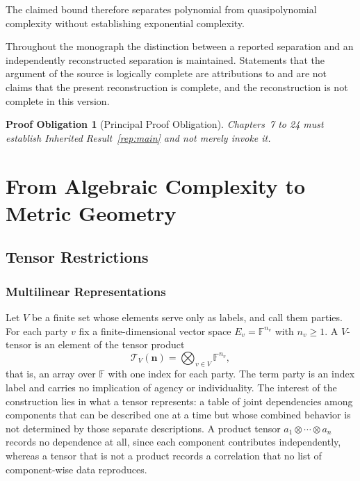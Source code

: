 \documentclass[11pt,letterpaper]{report}
\theoremstyle{plain}
\newtheorem{obligation}[theorem]{Proof Obligation}
\theoremstyle{definition}
\theoremstyle{remark}
\begin{document}
The claimed bound therefore separates polynomial from quasipolynomial complexity without establishing exponential complexity.

Throughout the monograph the distinction between a reported separation and an independently reconstructed separation is maintained. Statements that the argument of the source is logically complete are attributions to \cite{Source2026} and are not claims that the present reconstruction is complete, and the reconstruction is not complete in this version.

\begin{obligation}[Principal Proof Obligation]
Chapters~7 to 24 must establish Inherited Result~\ref{rep:main} and not merely invoke it.
\end{obligation}

\part{From Algebraic Complexity to Metric Geometry}

\chapter{Tensor Restrictions}

\section{Multilinear Representations}

Let $V$ be a finite set whose elements serve only as labels, and call them parties. For each party $v$ fix a finite-dimensional vector space $E_v=\mathbb F^{n_v}$ with $n_v\ge1$. A $V$-tensor is an element of the tensor product
\[
\mathcal T_V(\mathbf n)=\bigotimes_{v\in V}\mathbb F^{n_v},
\]
that is, an array over $\mathbb F$ with one index for each party. The term party is an index label and carries no implication of agency or individuality. The interest of the construction lies in what a tensor represents: a table of joint dependencies among components that can be described one at a time but whose combined behavior is not determined by those separate descriptions. A product tensor $a_1\otimes\cdots\otimes a_n$ records no dependence at all, since each component contributes independently, whereas a tensor that is not a product records a correlation that no list of component-wise data reproduces.
\end{document}
